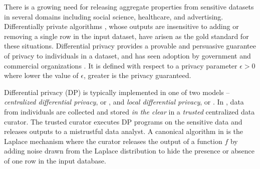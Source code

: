 
There is a growing need for releasing aggregate properties from sensitive datasets in several domains  including social science, healthcare, and advertising. Differentially private algorithms \cite{dwork}, whose outputs are insensitive to adding or removing a single row in the input dataset, have arisen as the gold standard for these situations. Differential privacy provides a provable and persuasive guarantee of privacy to individuals in a dataset, and has seen adoption by government \cite{machanavajjhala08onthemap,Vilhuber17Proceedings} and commercial organizations \cite{Rappor1,Apple, Samsung}. It is defined with respect to a privacy parameter $\epsilon > 0$ where lower the value of $\epsilon$, greater is the privacy guaranteed.

Differential privacy (DP) is typically implemented in one of two models -- \textit{centralized differential privacy}, or \cdp, and \textit{local differential privacy}, or \ldp. In \cdp, data from individuals are collected and stored \textit{in the clear} in a \textit{trusted} centralized data curator. The trusted curator executes DP programs on the sensitive data  and releases outputs to a mistrustful data analyst. A canonical algorithm in \cdp is the Laplace mechanism where the curator releases the output of a function $f$ by adding noise drawn from the Laplace distribution to hide the presence or absence of one row in the input database. 

